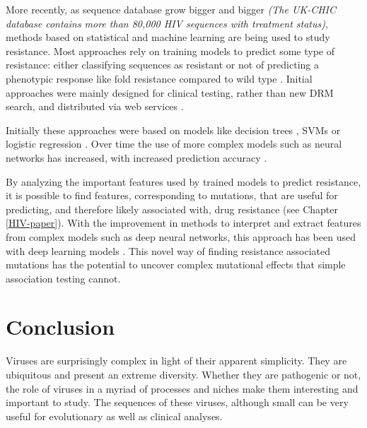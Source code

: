 \documentclass[
  11pt,
  twoside]{scrbook}
\begin{document}
More recently, as sequence database grow bigger and bigger \emph{(The UK-CHIC database contains more than 80,000 HIV sequences with treatment status)}, methods based on statistical and machine learning are being used to study resistance. Most approaches rely on training models to predict some type of resistance: either classifying sequences as resistant or not \autocite{blasselUsingMachineLearning2021,steinerDrugResistancePrediction2020a} of predicting a phenotypic response like fold resistance compared to wild type \autocite{sheikamamuddyImprovingFoldResistance2017b}. Initial approaches were mainly designed for clinical testing, rather than new DRM search, and distributed via web services \autocite{beerenwinkelGeno2phenoInterpretingGenotypic2001,riemenschneiderSHIVAWebApplication2016b}.

Initially these approaches were based on models like decision trees \autocite{beerenwinkelDiversityComplexityHIV12002c}, SVMs \autocite{beerenwinkelGeno2phenoInterpretingGenotypic2001} or logistic regression \autocite{heiderMultilabelClassificationExploiting2013b}. Over time the use of more complex models such as neural networks has increased, with increased prediction accuracy \autocite{sheikamamuddyImprovingFoldResistance2017b}.

By analyzing the important features used by trained models to predict resistance, it is possible to find features, corresponding to mutations, that are useful for predicting, and therefore likely associated with, drug resistance (see Chapter \ref{HIV-paper}). With the improvement in methods to interpret and extract features from complex models such as deep neural networks, this approach has been used with deep learning models \autocite{steinerDrugResistancePrediction2020a}. This novel way of finding resistance associated mutations has the potential to uncover complex mutational effects that simple association testing cannot.

\hypertarget{conclusion-1}{%
\section{Conclusion}\label{conclusion-1}}

Viruses are surprisingly complex in light of their apparent simplicity. They are ubiquitous and present an extreme diversity. Whether they are pathogenic or not, the role of viruses in a myriad of processes and niches make them interesting and important to study. The sequences of these viruses, although small can be very useful for evolutionary as well as clinical analyses.
\end{document}
